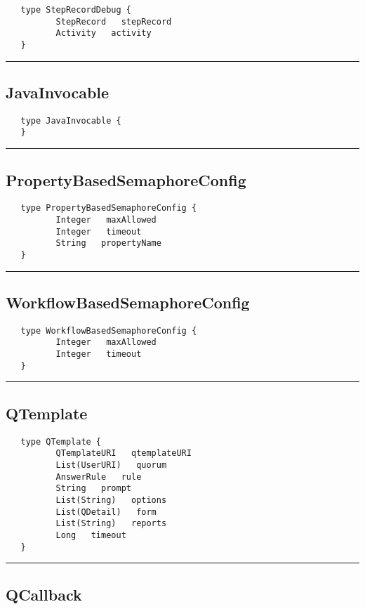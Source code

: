 \begin{verbatim}
   type StepRecordDebug {
          StepRecord   stepRecord
          Activity   activity
   }
\end{verbatim}

\rule{15cm}{2pt}
\subsection{JavaInvocable}
\label{type:JavaInvocable}

\begin{verbatim}
   type JavaInvocable {
   }
\end{verbatim}

\rule{15cm}{2pt}
\subsection{PropertyBasedSemaphoreConfig}
\label{type:PropertyBasedSemaphoreConfig}

\begin{verbatim}
   type PropertyBasedSemaphoreConfig {
          Integer   maxAllowed
          Integer   timeout
          String   propertyName
   }
\end{verbatim}

\rule{15cm}{2pt}
\subsection{WorkflowBasedSemaphoreConfig}
\label{type:WorkflowBasedSemaphoreConfig}

\begin{verbatim}
   type WorkflowBasedSemaphoreConfig {
          Integer   maxAllowed
          Integer   timeout
   }
\end{verbatim}

\rule{15cm}{2pt}
\subsection{QTemplate}
\label{type:QTemplate}

\begin{verbatim}
   type QTemplate {
          QTemplateURI   qtemplateURI
          List(UserURI)   quorum
          AnswerRule   rule
          String   prompt
          List(String)   options
          List(QDetail)   form
          List(String)   reports
          Long   timeout
   }
\end{verbatim}

\rule{15cm}{2pt}
\subsection{QCallback}
\label{type:QCallback}

